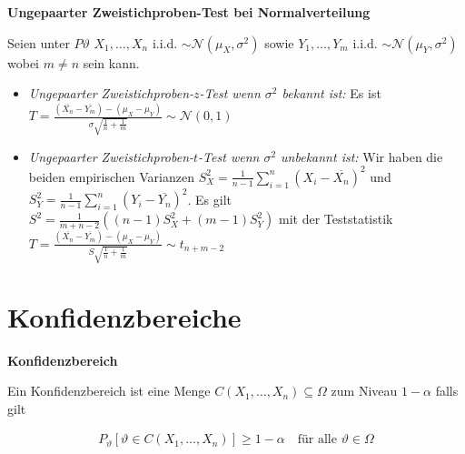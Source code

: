 \documentclass[25pt]{sciposter}
\newenvironment{method}[1]{\begin{mdframed}[backgroundcolor=blue!10,innertopmargin=15pt, innerbottommargin=15pt,nobreak=true]
		\textbf{#1 }
	}
	{ 
	\end{mdframed}
}
\begin{document}
\begin{multicols}{3}
\begin{method}{Ungepaarter Zweistichproben-Test bei Normalverteilung}
	Seien unter $P\vartheta$ $X_1,\ldots,X_n$ i.i.d. $\sim \mathcal{N}(\mu_X,\sigma^2)$ sowie $Y_1,\ldots,Y_m$ i.i.d. $\sim \mathcal{N}(\mu_Y,\sigma^2)$ wobei $m\neq n$ sein kann.
	\begin{itemize}
		\item \textit{Ungepaarter Zweistichproben-$z$-Test wenn $\sigma^2$ bekannt ist:} Es ist $T = \frac{(\overline{X_n} -\overline{Y_m}) - (\mu_X - \mu_Y)}{\sigma \sqrt{\frac{1}{n} + \frac{1}{m}}} \sim \mathcal{N}(0,1)$
		\item \textit{Ungepaarter Zweistichproben-$t$-Test wenn $\sigma^2$ unbekannt ist:} Wir haben die beiden empirischen Varianzen
		$S^2_X = \frac{1}{n-1} \sum_{i=1}^{n} (X_i - \overline{X_n})^2$ und $S^2_Y = \frac{1}{n-1} \sum_{i=1}^{n} (Y_i - \overline{Y_n})^2$. Es gilt $S^2 = \frac{1}{m+n-2}\left(\left(n-1\right)S_X^2 + \left(m-1\right)S_Y^2\right)$ mit der Teststatistik $T = \frac{(\overline{X_n} -\overline{Y_m}) - (\mu_X - \mu_Y)}{S \sqrt{\frac{1}{n} + \frac{1}{m}}} \sim t_{n+m-2}$
	\end{itemize}
	
\end{method}


\section{Konfidenzbereiche}

\begin{method}{Konfidenzbereich}
Ein Konfidenzbereich ist eine Menge $C(X_1,\ldots,X_n) \subseteq \Omega$ zum Niveau $1-\alpha$ falls gilt

\begin{align*}
	P_{\vartheta} \left[\vartheta \in C(X_1,\ldots,X_n) \right] \geq 1 - \alpha \quad \text{für alle } \vartheta \in \Omega
\end{align*}
\end{method}



\end{multicols}
\end{document}

